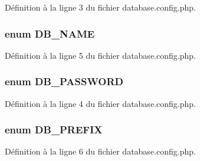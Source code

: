Définition à la ligne 3 du fichier database.\-config.\-php.

\hypertarget{database_8config_8php_a5d2a964cf672c9a1f11c290d6eafc2e1}{
\subsubsection[{D\-B\-\_\-\-N\-A\-M\-E}]{\setlength{\rightskip}{0pt plus 5cm}enum {\bf D\-B\-\_\-\-N\-A\-M\-E}}}\label{database_8config_8php_a5d2a964cf672c9a1f11c290d6eafc2e1}


Définition à la ligne 5 du fichier database.\-config.\-php.

\hypertarget{database_8config_8php_a7e717bf6e7045cd892772c56c69d9cb1}{
\subsubsection[{D\-B\-\_\-\-P\-A\-S\-S\-W\-O\-R\-D}]{\setlength{\rightskip}{0pt plus 5cm}enum {\bf D\-B\-\_\-\-P\-A\-S\-S\-W\-O\-R\-D}}}\label{database_8config_8php_a7e717bf6e7045cd892772c56c69d9cb1}


Définition à la ligne 4 du fichier database.\-config.\-php.

\hypertarget{database_8config_8php_a74805092b141953388487c75e8be4127}{
\subsubsection[{D\-B\-\_\-\-P\-R\-E\-F\-I\-X}]{\setlength{\rightskip}{0pt plus 5cm}enum {\bf D\-B\-\_\-\-P\-R\-E\-F\-I\-X}}}\label{database_8config_8php_a74805092b141953388487c75e8be4127}


Définition à la ligne 6 du fichier database.\-config.\-php.

